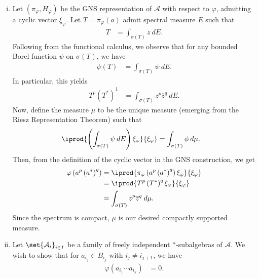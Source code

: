 \documentclass[10pt]{mypackage}
\begin{document}
\begin{solution}\hfill
  \begin{enumerate}[(i)]
    \item Let $\left( \pi_{\varphi},H_{\varphi} \right)$ be the GNS representation of $\mathcal{A}$ with respect to $\varphi$, admitting a cyclic vector $\xi_{\varphi}$. Let $T = \pi_{\varphi}(a)$ admit spectral measure $E$ such that
      \begin{align*}
        T &= \int_{\sigma(T)}^{} z\:dE.
      \end{align*}
      Following from the functional calculus, we observe that for any bounded Borel function $\psi$ on $\sigma(T)$, we have
      \begin{align*}
        \psi(T) &= \int_{\sigma(T)}^{} \psi\:dE.
      \end{align*}
      In particular, this yields
      \begin{align*}
        T^{p}\left( T^{\ast} \right)^{1} &= \int_{\sigma(T)}^{} z^{p} \overline{z}^{q}\:dE.
      \end{align*}
      Now, define the measure $\mu$ to be the unique measure (emerging from the Riesz Representation Theorem) such that
      \begin{align*}
        \iprod{\left( \int_{\sigma(T)}^{} \psi\:dE \right)\xi_{\varphi}}{\xi_{\varphi}} &= \int_{\sigma(T)}^{} \phi\:d\mu.
      \end{align*}
      Then, from the definition of the cyclic vector in the GNS construction, we get
      \begin{align*}
        \varphi\left( a^{p}\left( a^{\ast} \right)^{q} \right) &= \iprod{\pi_{\varphi}\left( a^{p}\left( a^{\ast} \right)^{q} \right)\xi_{\varphi}}{\xi_{\varphi}}\\
                                                               &= \iprod{T^{p}\left( T^{\ast} \right)^{q}\xi_{\varphi}}{\xi_{\varphi}}\\
                                                               &= \int_{\sigma(T)}^{} z^{p} \overline{z}^{q}\:d\mu.
      \end{align*}
      Since the spectrum is compact, $\mu$ is our desired compactly supported measure.
    \item Let $\set{\mathcal{A}_i}_{i\in I}$ be a family of freely independent $\ast$-subalgebras of $\mathcal{A}$. We wish to show that for $a_{i_j}\in B_{i_j}$ with $i_j\neq i_{j+1}$, we have
      \begin{align*}
        \varphi\left( a_{i_1}\cdots a_{i_{k}} \right) &= 0.

\end{align*}
\end{enumerate}
\end{solution}
\end{document}
